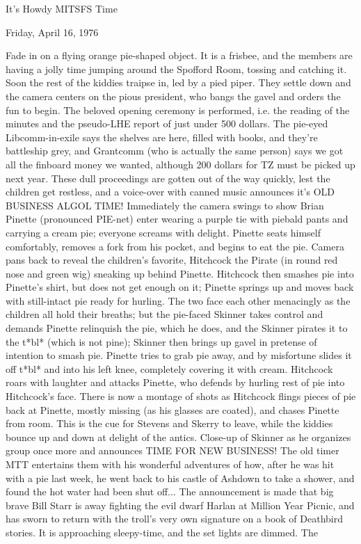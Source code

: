 \documentclass[12pt]{article}
\begin{document}
\begin{center}

It's Howdy MITSFS Time

Friday, April 16, 1976

\end{center}
 
\vspace{12pt}

\setlength{\parskip}{6pt}

\noindent
Fade in on a flying orange pie-shaped object. It is a frisbee, and the members are having a jolly time jumping around the Spofford Room, tossing and catching it. Soon the rest of the kiddies traipse in, led by a pied piper. They settle down and the camera centers on the pious president, who bangs the gavel and orders the fun to begin. The beloved opening ceremony is performed, i.e. the reading of the minutes and the pseudo-LHE report of just under 500 dollars. The pie-eyed Libcomm-in-exile says the shelves are here, filled with books, and they're battleship grey, and Grantcomm (who is actually the same person) says we got all the finboard money we wanted, although 200 dollars for TZ must be picked up next year. These dull proceedings are gotten out of the way quickly, lest the children get restless, and a voice-over with canned music announces it's OLD BUSINESS ALGOL TIME! Immediately the camera swings to show Brian Pinette (pronounced PIE-net) enter wearing a purple tie with piebald pants and carrying a cream pie; everyone screams with delight. Pinette seats himself comfortably, removes a fork from his pocket, and begins to eat the pie. Camera pans back to reveal the children's favorite, Hitchcock the Pirate (in round red nose and green wig) sneaking up behind Pinette. Hitchcock then smashes pie into Pinette's shirt, but does not get enough on it; Pinette springs up and moves back with still-intact pie ready for hurling. The two face each other menacingly as the children all hold their breaths; but the pie-faced Skinner takes control and demands Pinette relinquish the pie, which he does, and the Skinner pirates it to the t*bl* (which is not pine); Skinner then brings up gavel in pretense of intention to smash pie. Pinette tries to grab pie away, and by misfortune slides it off t*bl* and into his left knee, completely covering it with cream. Hitchcock roars with laughter and attacks Pinette, who defends by hurling rest of pie into Hitchcock's face. There is now a montage of shots as Hitchcock flings pieces of pie back at Pinette, mostly missing (as his glasses are coated), and chases Pinette from room. This is the cue for Stevens and Skerry to leave, while the kiddies bounce up and down at delight of the antics. Close-up of Skinner as he organizes group once more and announces TIME FOR NEW BUSINESS! The old timer MTT entertains them with his wonderful adventures of how, after he was hit with a pie last week, he went back to his castle of Ashdown to take a shower, and found the hot water had been shut off... The announcement is made that big brave Bill Starr is away fighting the evil dwarf Harlan at Million Year Picnic, and has sworn to return with the troll's very own signature on a book of Deathbird stories. It is approaching sleepy-time, and the set lights are dimmed. The 
\end{document}
